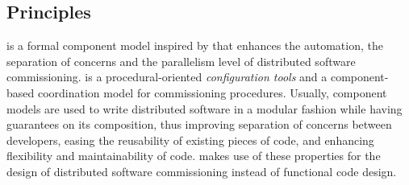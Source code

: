 
\subsection{Principles}

\mad is a formal component model inspired by \aeolus that enhances the automation, the separation of concerns and the parallelism level of distributed software commissioning. \mad is a procedural-oriented \emph{configuration tools} and a component-based coordination model for commissioning procedures. Usually, component models are used to write distributed software in a modular fashion while having guarantees on its composition, thus improving separation of concerns between developers, easing the reusability of existing pieces of code, and enhancing flexibility and maintainability of code. \mad makes use of these properties for the design of distributed software commissioning instead of functional code design.

